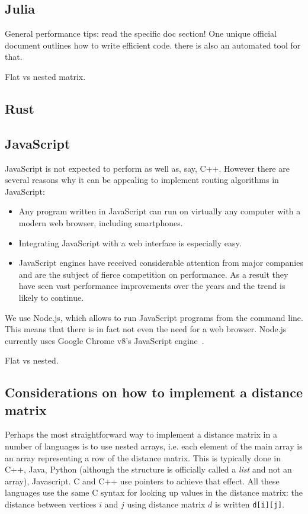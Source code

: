 \documentclass[11pt,a4paper,notitlepage]{article}
\begin{document}
\subsection{Julia}
General performance tips: read the specific doc section! One unique
official document outlines how to write efficient code. there is also
an automated tool for that.

Flat vs nested matrix.

\subsection{Rust}

\subsection{JavaScript}
JavaScript is not expected to perform as well as, say, C++. However
there are several reasons why it can be appealing to implement routing
algorithms in JavaScript:
\begin{itemize}
\item Any program written in JavaScript can run on virtually any
  computer with a modern web browser, including smartphones.
\item Integrating JavaScript with a web interface is especially easy.
\item JavaScript engines have received considerable attention from
  major companies and are the subject of fierce competition on
  performance. As a result they have seen vast performance
  improvements over the years and the trend is likely to continue.
\end{itemize}

We use Node.js, which allows to run JavaScript programs from the
command line. This means that there is in fact not even the need for a
web browser. Node.js currently uses Google Chrome v8's JavaScript
engine~\cite{nodejs}.

Flat vs nested.

\subsection{Considerations on how to implement a distance matrix}
Perhaps the most straightforward way to implement a distance matrix in
a number of languages is to use nested arrays, i.e. each element of the
main array is an array representing a row of the distance matrix. This
is typically done in C++, Java, Python (although the structure is
officially called a \emph{list} and not an array), Javascript. C and
C++ use pointers to achieve that effect. All these languages use the
same C syntax for looking up values in the distance matrix: the
distance between vertices $i$ and $j$ using distance matrix $d$ is
written \lstinline{d[i][j]}.
\end{document}
